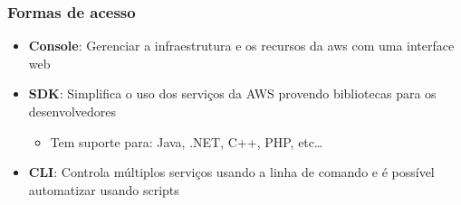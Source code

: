 \begin{frame}
	\frametitle{Formas de acesso}
	\begin{itemize}
		\item \textbf{Console}: Gerenciar a infraestrutura e os recursos da aws com uma interface web
		\item \textbf{SDK}: Simplifica o uso dos serviços da AWS provendo bibliotecas para os desenvolvedores
			\begin{itemize}
				\item Tem suporte para: Java, .NET, C++, PHP, etc\dots
			\end{itemize}
		\item \textbf{CLI}: Controla múltiplos serviços usando a linha de comando e é possível automatizar usando scripts
	\end{itemize}
\end{frame}
